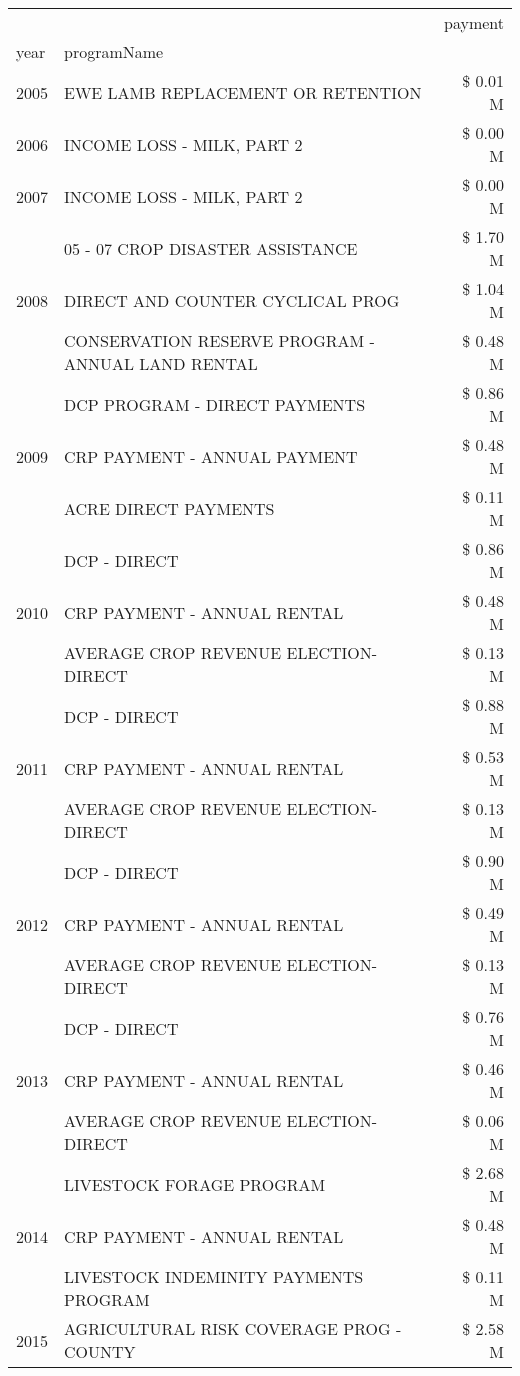 \begin{tabular}{llr}
\toprule
 &  & payment \\
year & programName &  \\
\midrule
2005 & EWE LAMB REPLACEMENT OR RETENTION & \$ 0.01 M \\
\cline{1-3}
2006 & INCOME LOSS - MILK, PART 2 & \$ 0.00 M \\
\cline{1-3}
2007 & INCOME LOSS - MILK, PART 2 & \$ 0.00 M \\
\cline{1-3}
\multirow[t]{3}{*}{2008} & 05 - 07 CROP DISASTER ASSISTANCE & \$ 1.70 M \\
 & DIRECT AND COUNTER CYCLICAL PROG & \$ 1.04 M \\
 & CONSERVATION RESERVE PROGRAM - ANNUAL LAND RENTAL & \$ 0.48 M \\
\cline{1-3}
\multirow[t]{3}{*}{2009} & DCP PROGRAM - DIRECT PAYMENTS & \$ 0.86 M \\
 & CRP PAYMENT - ANNUAL PAYMENT & \$ 0.48 M \\
 & ACRE DIRECT PAYMENTS & \$ 0.11 M \\
\cline{1-3}
\multirow[t]{3}{*}{2010} & DCP - DIRECT & \$ 0.86 M \\
 & CRP PAYMENT - ANNUAL RENTAL & \$ 0.48 M \\
 & AVERAGE CROP REVENUE ELECTION-DIRECT & \$ 0.13 M \\
\cline{1-3}
\multirow[t]{3}{*}{2011} & DCP - DIRECT & \$ 0.88 M \\
 & CRP PAYMENT - ANNUAL RENTAL & \$ 0.53 M \\
 & AVERAGE CROP REVENUE ELECTION-DIRECT & \$ 0.13 M \\
\cline{1-3}
\multirow[t]{3}{*}{2012} & DCP - DIRECT & \$ 0.90 M \\
 & CRP PAYMENT - ANNUAL RENTAL & \$ 0.49 M \\
 & AVERAGE CROP REVENUE ELECTION-DIRECT & \$ 0.13 M \\
\cline{1-3}
\multirow[t]{3}{*}{2013} & DCP - DIRECT & \$ 0.76 M \\
 & CRP PAYMENT - ANNUAL RENTAL & \$ 0.46 M \\
 & AVERAGE CROP REVENUE ELECTION-DIRECT & \$ 0.06 M \\
\cline{1-3}
\multirow[t]{3}{*}{2014} & LIVESTOCK FORAGE PROGRAM & \$ 2.68 M \\
 & CRP PAYMENT - ANNUAL RENTAL & \$ 0.48 M \\
 & LIVESTOCK INDEMINITY PAYMENTS PROGRAM & \$ 0.11 M \\
\cline{1-3}
\multirow[t]{3}{*}{2015} & AGRICULTURAL RISK COVERAGE PROG - COUNTY & \$ 2.58 M \\

\end{tabular}
